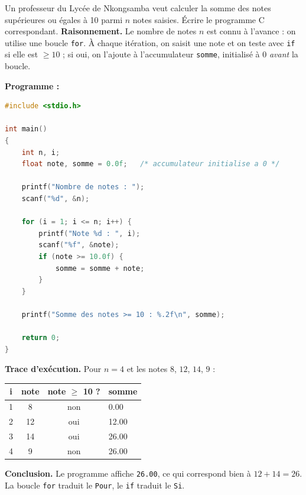 \documentclass[11pt]{article}
\begin{document}
\begin{exoresolu}
Un professeur du Lycée de Nkongsamba veut calculer la somme des notes supérieures ou égales à 10 parmi $n$ notes saisies. Écrire le programme C correspondant.
\tcblower
\textbf{Raisonnement.} Le nombre de notes $n$ est connu à l'avance : on utilise une boucle \texttt{for}. À chaque itération, on saisit une note et on teste avec \texttt{if} si elle est $\geq 10$ ; si oui, on l'ajoute à l'accumulateur \texttt{somme}, initialisé à 0 \emph{avant} la boucle.

\textbf{Programme :}
\begin{lstlisting}[language=C]
#include <stdio.h>

int main()
{
    int n, i;
    float note, somme = 0.0f;   /* accumulateur initialise a 0 */

    printf("Nombre de notes : ");
    scanf("%d", &n);

    for (i = 1; i <= n; i++) {
        printf("Note %d : ", i);
        scanf("%f", &note);
        if (note >= 10.0f) {
            somme = somme + note;
        }
    }

    printf("Somme des notes >= 10 : %.2f\n", somme);

    return 0;
}
\end{lstlisting}
\textbf{Trace d'exécution.} Pour $n = 4$ et les notes $8$, $12$, $14$, $9$ :
\begin{center}
\begin{tabularx}{\linewidth}{|c|c|c|X|}
\hline
\rowcolor{popblueL} \textbf{i} & \textbf{note} & \textbf{note $\geq$ 10 ?} & \textbf{somme} \\
\hline
1 & 8 & non & 0.00 \\
\hline
2 & 12 & oui & 12.00 \\
\hline
3 & 14 & oui & 26.00 \\
\hline
4 & 9 & non & 26.00 \\
\hline
\end{tabularx}
\end{center}
\textbf{Conclusion.} Le programme affiche \texttt{26.00}, ce qui correspond bien à $12 + 14 = 26$. La boucle \texttt{for} traduit le \texttt{Pour}, le \texttt{if} traduit le \texttt{Si}.
\end{exoresolu}
\end{document}
